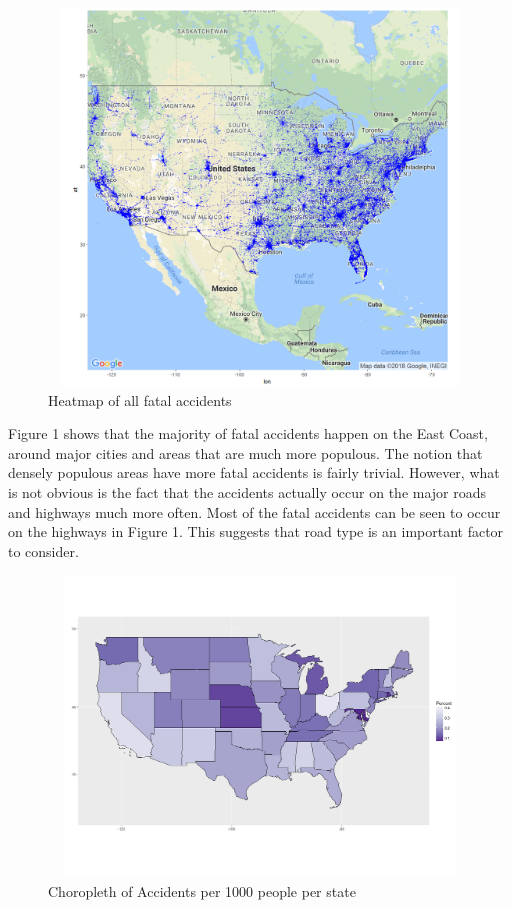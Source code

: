 \documentclass[11pt, oneside,titlepage]{article}   	%
\begin{document}
\begin{figure}[H]
\centering
  \includegraphics[width=15cm,height=10cm,keepaspectratio]{heatmap.png}
\caption{Heatmap of all fatal accidents}
\end{figure}

Figure 1 shows that the majority of fatal accidents happen on the East Coast, around major cities and areas that are much more populous. The notion that densely populous areas have more fatal accidents is fairly trivial. However, what is not obvious is the fact that the accidents actually occur on the major roads and highways much more often. Most of the fatal accidents can be seen to occur on the highways in Figure 1. This suggests that road type is an important factor to consider.

\begin{figure}[H]
\centering
  \includegraphics[width=15cm,height=8cm,keepaspectratio]{choropleth.png}
\caption{Choropleth of Accidents per 1000 people per state}
\end{figure}
\end{document}
